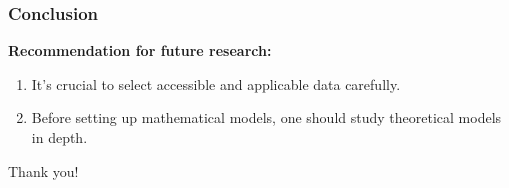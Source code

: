 \documentclass[compress,handout,10pt]{beamer}
\let\olditem\item
\renewcommand{\item}{\setlength{\itemsep}{0.5\baselineskip}\olditem}
\begin{document}
\begin{frame}
    \frametitle{Conclusion}
{\bf{Recommendation for future research:}}\\
\begin{enumerate}
\item It's crucial to select accessible and applicable data carefully.
\item Before setting up mathematical models, one should study theoretical models in depth.\\
\end{enumerate}
\end{frame}
\begin{frame}
\begin{center}
\vspace{15pt}
\Huge{Thank you!}
\end{center}
\end{frame}
\end{document}
